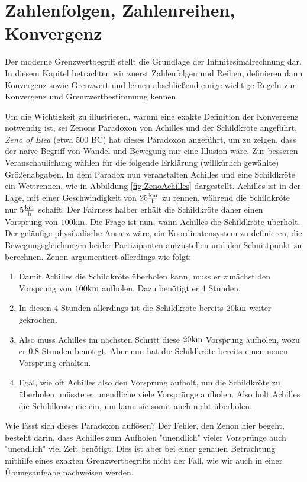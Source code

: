 \chapter{Zahlenfolgen, Zahlenreihen, Konvergenz}

Der moderne Grenzwertbegriff stellt die Grundlage der Infinitesimalrechnung dar. In diesem Kapitel betrachten wir zuerst Zahlenfolgen und Reihen, definieren dann Konvergenz sowie Grenzwert und lernen abschließend einige wichtige Regeln zur Konvergenz und Grenzwertbestimmung kennen.

Um die Wichtigkeit zu illustrieren, warum eine exakte Definition der Konvergenz notwendig ist, sei Zenons Paradoxon von Achilles und der Schildkröte angeführt. \emph{Zeno of Elea} (etwa 500 BC) hat dieses Paradoxon angeführt, um zu zeigen, dass der naive Begriff von Wandel und Bewegung nur eine Illusion wäre. Zur besseren Veranschaulichung wählen für die folgende Erklärung (willkürlich gewählte) Größenabgaben. In dem Paradox nun veranstalten Achilles und eine Schildkröte ein Wettrennen, wie in Abbildung \ref{fig:ZenoAchilles} dargestellt. Achilles ist in der Lage, mit einer Geschwindigkeit von $25\frac{\text{km}}{\text{h}}$ zu rennen, während die Schildkröte nur $5\frac{\text{km}}{\text{h}}$ schafft. Der Fairness halber erhält die Schildkröte daher einen Vorsprung von $100\text{km}$. Die Frage ist nun, wann Achilles die Schildkröte überholt. Der geläufige physikalische Ansatz wäre, ein Koordinatensystem zu definieren, die Bewegungsgleichungen beider Partizipanten aufzustellen und den Schnittpunkt zu berechnen. Zenon argumentiert allerdings wie folgt:

\begin{enumerate}
	\item Damit Achilles die Schildkröte überholen kann, muss er zunächst den Vorsprung von $100\text{km}$ aufholen. Dazu benötigt er $4$ Stunden.
	\item In diesen $4$ Stunden allerdings ist die Schildkröte bereits $20\text{km}$ weiter gekrochen.
	\item Also muss Achilles im nächsten Schritt diese $20\text{km}$ Vorsprung aufholen, wozu er $0.8$ Stunden benötigt. Aber nun hat die Schildkröte bereits einen neuen Vorsprung erhalten.
	\item Egal, wie oft Achilles also den Vorsprung aufholt, um die Schildkröte zu überholen, müsste er unendliche viele Vorsprünge aufholen. Also holt Achilles die Schildkröte nie ein, um kann sie somit auch nicht überholen.
\end{enumerate}

Wie lässt sich dieses Paradoxon auflösen? Der Fehler, den Zenon hier begeht, besteht darin, dass Achilles zum Aufholen "unendlich" vieler Vorsprünge auch "unendlich" viel Zeit benötigt. Dies ist aber bei einer genauen Betrachtung mithilfe eines exakten Grenzwertbegriffs nicht der Fall, wie wir auch in einer Übungsaufgabe nachweisen werden.

